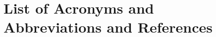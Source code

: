 \documentclass[letter]{ar-1col_WFIRST-HLS}
\begin{document}
\section*{List of Acronyms and Abbreviations and References}
\label{sec:acronyms}
\vspace{2 cm}


\clearpage
\newpage


%



\clearpage
\newpage
\end{document}
